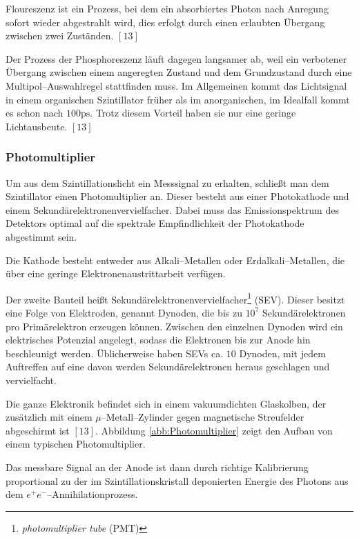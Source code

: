 \documentclass[12pt,a4paper]{scrartcl}
\numberwithin{equation}{section} %
\newcommand{\pu}[1]{\ensuremath{\mathrm{#1}}}
\begin{document}
Floureszenz ist ein Prozess, bei dem ein absorbiertes Photon nach Anregung sofort wieder abgestrahlt wird, dies erfolgt durch einen erlaubten Übergang zwischen zwei Zuständen. $[13]$

Der Prozess der Phosphoreszenz läuft dagegen langsamer ab, weil ein verbotener Übergang zwischen einem angeregten Zustand und dem Grundzustand durch eine Multipol--Auswahlregel stattfinden muss. Im Allgemeinen kommt das Lichtsignal in einem organischen Szintillator früher als im anorganischen, im Idealfall kommt es schon nach $\pu{100 ps}$. Trotz diesem Vorteil haben sie nur eine geringe Lichtausbeute. $[13]$

\hypertarget{photomultiplier}{%
\subsubsection{Photomultiplier}\label{photomultiplier}}

Um aus dem Szintillationslicht ein Messsignal zu erhalten, schließt man dem Szintillator einen Photomultiplier an. Dieser besteht aus einer Photokathode und einem Sekundärelektronenvervielfacher. Dabei muss das Emissionspektrum des Detektors optimal auf die spektrale Empfindlichkeit der Photokathode abgestimmt sein.

Die Kathode besteht entweder aus Alkali--Metallen oder Erdalkali--Metallen, die über eine geringe Elektronenaustrittarbeit verfügen.

Der zweite Bauteil heißt Sekundärelektronenvervielfacher\footnote{\emph{photomultiplier tube} (PMT)} (SEV). Dieser besitzt eine Folge von Elektroden, genannt Dynoden, die bis zu $10^7$ Sekundärelektronen pro Primärelektron erzeugen können. Zwischen den einzelnen Dynoden wird ein elektrisches Potenzial angelegt, sodass die Elektronen bis zur Anode hin beschleunigt werden. Üblicherweise haben SEVs ca. $10$ Dynoden, mit jedem Auftreffen auf eine davon werden Sekundärelektronen heraus geschlagen und vervielfacht.

Die ganze Elektronik befindet sich in einem vakuumdichten Glaskolben, der zusätzlich mit einem $\mu$--Metall--Zylinder gegen magnetische Streufelder abgeschirmt ist $[13]$. Abbildung \ref{abb:Photomultiplier} zeigt den Aufbau von einem typischen Photomultiplier.

Das messbare Signal an der Anode ist dann durch richtige Kalibrierung proportional zu der im Szintillationskristall deponierten Energie des Photons aus dem $e^+ e^-$--Annihilationprozess.
\end{document}
